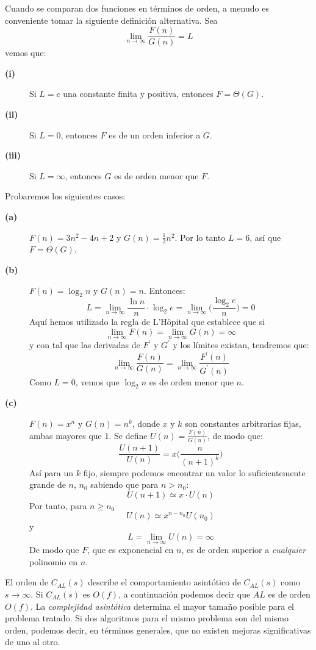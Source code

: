 \documentclass[10pt,a5paper]{book}
\begin{document}
Cuando se comparan dos funciones en términos de orden, a menudo es conveniente tomar la siguiente definición alternativa. Sea \[\lim_{n\rightarrow\infty}\frac{F(n)}{G(n)} = L \] vemos que:
\begin{description}
  \item[\textbf{(i)}] Si $L = c$ una constante finita y positiva, entonces $F = \Theta(G)$.
  \item[\textbf{(ii)}] Si $L = 0$, entonces $F$ es de un orden inferior a $G$.
  \item[\textbf{(iii)}] Si $L = \infty$, entonces $G$ es de orden menor que $F$.
\end{description}
Probaremos los siguientes casos:
\begin{description}
  \item[\textbf{(a)}] $F(n) = 3n^2 - 4n + 2$ y $G(n) = \frac{1}{2}n^2$. Por lo tanto $L = 6$, así que $F = \Theta(G)$.
  \item[\textbf{(b)}] $F(n) = \log_2 n$ y $G(n) = n$. Entonces:\[ L = \lim_{n\rightarrow\infty}\frac{\ln n}{n}\cdot\log_{2}e = \lim_{n\rightarrow\infty}\bigg(\frac{\log_{2}e}{n}\bigg)=0\] Aquí hemos utilizado la regla de L'Hôpital que establece que si \[ \lim_{n\rightarrow\infty} F(n) = \lim_{n\rightarrow\infty} G(n) = \infty \] y con tal que las derivadas de $F^{'}$ y $G^{'}$ y los límites existan, tendremos que:\[ \lim_{n\rightarrow\infty}\frac{F(n)}{G(n)} = \lim_{n\rightarrow\infty}\frac{F^{'}(n)}{G^{'}(n)} \]Como $L = 0$, vemos que $\log_2n$ es de orden menor que $n$.
  \item[\textbf{(c)}] $F(n) = x^n$ y $G(n) = n^k$, donde $x$ y $k$ son constantes arbitrarias fijas, ambas mayores que 1. Se define $U(n) = \frac{F(n)}{G(n)}$, de modo que: \[ \frac{U(n+1)}{U(n)} = x\bigg(\frac{n}{(n+1)^k}\bigg) \] Así para un $k$ fijo, siempre podemos encontrar un valor lo suficientemente grande de $n$, $n_0$ sabiendo que para $n > n_0$: \[U(n+1) \simeq x\cdot U(n) \] Por tanto, para $n \ge n_0$ \[ U(n) \simeq x^{n-n_{0}}U(n_0) \] y \[ L = \lim_{n\rightarrow\infty} U(n) = \infty \] De modo que $F$, que es exponencial en $n$, es de orden superior a \emph{cualquier} polinomio en $n$.
\end{description}
El orden de $C_{AL}(s)$ describe el comportamiento asintótico de $C_{AL}(s)$ como $s \rightarrow\infty$. Si $C_{AL}(s)$ es $O(f)$, a continuación podemos decir que $AL$ es de orden $O(f)$. La \emph{complejidad asintótica} determina el mayor tamaño posible para el problema tratado. Si dos algoritmos para el mismo problema son del mismo orden, podemos decir, en términos generales, que no existen mejoras significativas de uno al otro.
\end{document}
